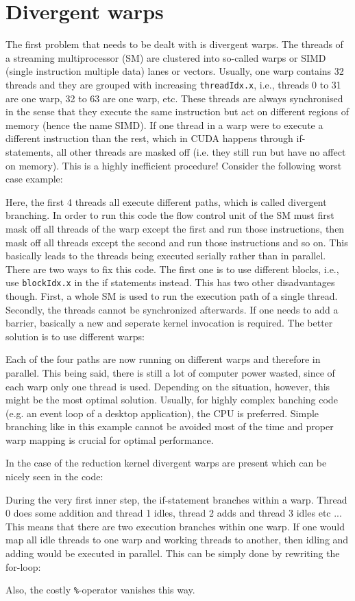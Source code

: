 \section{Divergent warps}
The first problem that needs to be dealt with is divergent warps.
The threads of a streaming multiprocessor (SM) are clustered into so-called warps or SIMD (single instruction multiple data) lanes or vectors.
Usually, one warp contains 32 threads and they are grouped with increasing \texttt{threadIdx.x}, i.e., threads 0 to 31 are one warp, 32 to 63 are one warp, etc.
These threads are always synchronised in the sense that they execute the same instruction but act on different regions of memory (hence the name SIMD).
If one thread in a warp were to execute a different instruction than the rest, which in CUDA happens through if-statements, all other threads are masked off (i.e. they still run but have no affect on memory).
This is a highly inefficient procedure! 
Consider the following worst case example:

Here, the first 4 threads all execute different paths, which is called divergent branching.
In order to run this code the flow control unit of the SM must first mask off all threads of the warp except the first and run those instructions, then mask off all threads except the second and run those instructions and so on.
This basically leads to the threads being executed serially rather than in parallel.
There are two ways to fix this code.
The first one is to use different blocks, i.e., use \texttt{blockIdx.x} in the if statements instead.
This has two other disadvantages though.
First, a whole SM is used to run the execution path of a single thread.
Secondly, the threads cannot be synchronized afterwards.
If one needs to add a barrier, basically a new and seperate kernel invocation is required.
The better solution is to use different warps:

Each of the four paths are now running on different warps and therefore in parallel.
This being said, there is still a lot of computer power wasted, since of each warp only one thread is used.
Depending on the situation, however, this might be the most optimal solution.
Usually, for highly complex banching code (e.g. an event loop of a desktop application), the CPU is preferred.
Simple branching like in this example cannot be avoided most of the time and proper warp mapping is crucial for optimal performance. 

In the case of the reduction kernel divergent warps are present which can be nicely seen in the code:

During the very first inner step, the if-statement branches within a warp.
Thread 0 does some addition and thread 1 idles, thread 2 adds and thread 3 idles etc ...
This means that there are two execution branches within one warp.
If one would map all idle threads to one warp and working threads to another, then idling and adding would be executed in parallel.
This can be simply done by rewriting the for-loop:

Also, the costly \texttt{\%}-operator vanishes this way.

